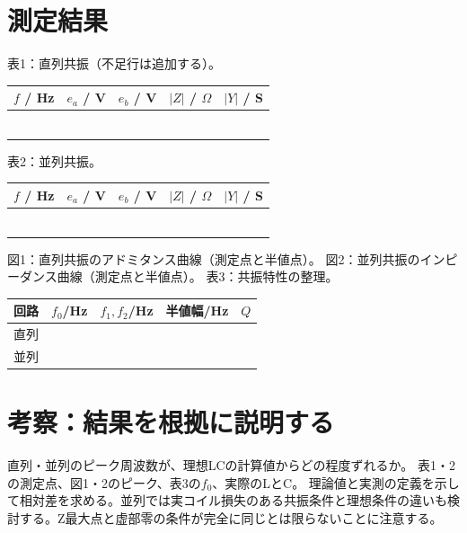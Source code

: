\documentclass[lualatex,a4paper,10pt]{jlreq}
\begin{document}
\section{測定結果}\label{sec:auto5}
表1：直列共振（不足行は追加する）。
\par\noindent\begin{tabularx}{\linewidth}{YYYYY}
\toprule $f$ / Hz & $e_a$ / V & $e_b$ / V & $|Z|$ / $\Omega$ & $|Y|$ / S\\\midrule
 & & & &\\ & & & &\\ & & & &\\ & & & &\\ & & & &\\ & & & &\\\bottomrule
\end{tabularx}
表2：並列共振。
\par\noindent\begin{tabularx}{\linewidth}{YYYYY}
\toprule $f$ / Hz & $e_a$ / V & $e_b$ / V & $|Z|$ / $\Omega$ & $|Y|$ / S\\\midrule
 & & & &\\ & & & &\\ & & & &\\ & & & &\\ & & & &\\ & & & &\\\bottomrule
\end{tabularx}
\clearpage
図1：直列共振のアドミタンス曲線（測定点と半値点）。
\writing{40mm}
図2：並列共振のインピーダンス曲線（測定点と半値点）。
\writing{40mm}
表3：共振特性の整理。
\par\noindent\begin{tabularx}{\linewidth}{YYYYY}
\toprule 回路 & $f_0$/Hz & $f_1,f_2$/Hz & 半値幅/Hz & $Q$\\\midrule
直列 & & & &\\並列 & & & &\\\bottomrule
\end{tabularx}
\clearpage\section{考察：結果を根拠に説明する}\label{sec:auto6}
{直列・並列のピーク周波数が、理想LCの計算値からどの程度ずれるか。}
{表1・2の測定点、図1・2のピーク、表3の$f_0$、実際のLとC。}
{理論値と実測の定義を示して相対差を求める。並列では実コイル損失のある共振条件と理想条件の違いも検討する。Z最大点と虚部零の条件が完全に同じとは限らないことに注意する。}
\end{document}
